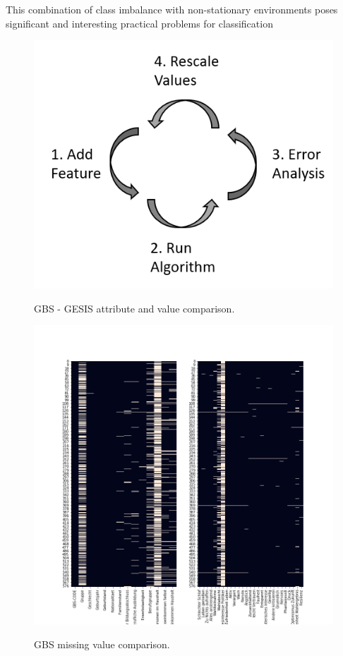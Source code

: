 This combination of class imbalance with non-stationary environments poses signiﬁcant and interesting practical problems for classiﬁcation


\begin{figure}[ht]
	\begin{center}
		\includegraphics[scale=0.50,angle=0]{fig/workflow_data_processing}
		\label{std}
		\caption{GBS - GESIS attribute and value comparison.}
	\end{center}
\end{figure}

\begin{figure}[ht]
	\begin{center}
		\includegraphics[scale=0.50,angle=0]{fig/gbs_missing}
		\label{std}
		\caption{GBS missing value comparison.}
	\end{center}
\end{figure}

